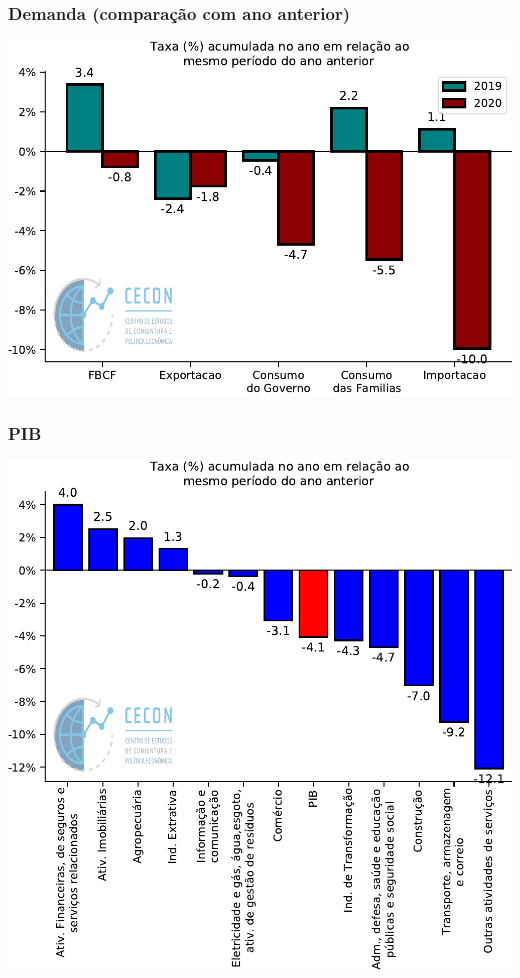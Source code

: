 \documentclass{SelfArx}
\begin{document}
\subsubsection*{Demanda (comparação com ano anterior)}
\label{sec:orga27a1a9}

\begin{center}
\includegraphics[width=.9\linewidth]{./figs/PIB/Demanda_Acum_Comparativo.pdf}
\end{center}

\subsubsection*{PIB}
\label{sec:org7579508}

\begin{center}
\includegraphics[width=.9\linewidth]{./figs/PIB/PIB_Acum.pdf}
\end{center}
\end{document}
